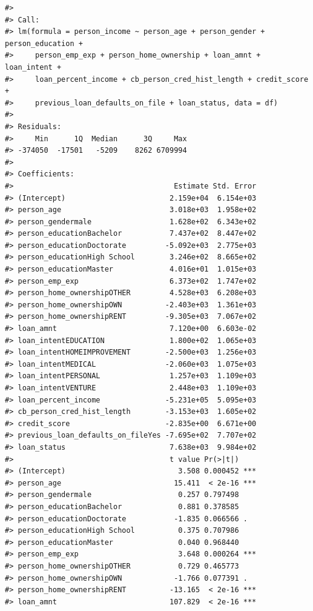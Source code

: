 \documentclass[
  10pt,
]{article}
\begin{document}
\begin{verbatim}
#> 
#> Call:
#> lm(formula = person_income ~ person_age + person_gender + person_education + 
#>     person_emp_exp + person_home_ownership + loan_amnt + loan_intent + 
#>     loan_percent_income + cb_person_cred_hist_length + credit_score + 
#>     previous_loan_defaults_on_file + loan_status, data = df)
#> 
#> Residuals:
#>     Min      1Q  Median      3Q     Max 
#> -374050  -17501   -5209    8262 6709994 
#> 
#> Coefficients:
#>                                     Estimate Std. Error
#> (Intercept)                        2.159e+04  6.154e+03
#> person_age                         3.018e+03  1.958e+02
#> person_gendermale                  1.628e+02  6.343e+02
#> person_educationBachelor           7.437e+02  8.447e+02
#> person_educationDoctorate         -5.092e+03  2.775e+03
#> person_educationHigh School        3.246e+02  8.665e+02
#> person_educationMaster             4.016e+01  1.015e+03
#> person_emp_exp                     6.373e+02  1.747e+02
#> person_home_ownershipOTHER         4.528e+03  6.208e+03
#> person_home_ownershipOWN          -2.403e+03  1.361e+03
#> person_home_ownershipRENT         -9.305e+03  7.067e+02
#> loan_amnt                          7.120e+00  6.603e-02
#> loan_intentEDUCATION               1.800e+02  1.065e+03
#> loan_intentHOMEIMPROVEMENT        -2.500e+03  1.256e+03
#> loan_intentMEDICAL                -2.060e+03  1.075e+03
#> loan_intentPERSONAL                1.257e+03  1.109e+03
#> loan_intentVENTURE                 2.448e+03  1.109e+03
#> loan_percent_income               -5.231e+05  5.095e+03
#> cb_person_cred_hist_length        -3.153e+03  1.605e+02
#> credit_score                      -2.835e+00  6.671e+00
#> previous_loan_defaults_on_fileYes -7.695e+02  7.707e+02
#> loan_status                        7.638e+03  9.984e+02
#>                                    t value Pr(>|t|)    
#> (Intercept)                          3.508 0.000452 ***
#> person_age                          15.411  < 2e-16 ***
#> person_gendermale                    0.257 0.797498    
#> person_educationBachelor             0.881 0.378585    
#> person_educationDoctorate           -1.835 0.066566 .  
#> person_educationHigh School          0.375 0.707986    
#> person_educationMaster               0.040 0.968440    
#> person_emp_exp                       3.648 0.000264 ***
#> person_home_ownershipOTHER           0.729 0.465773    
#> person_home_ownershipOWN            -1.766 0.077391 .  
#> person_home_ownershipRENT          -13.165  < 2e-16 ***
#> loan_amnt                          107.829  < 2e-16 ***

\end{verbatim}
\end{document}
